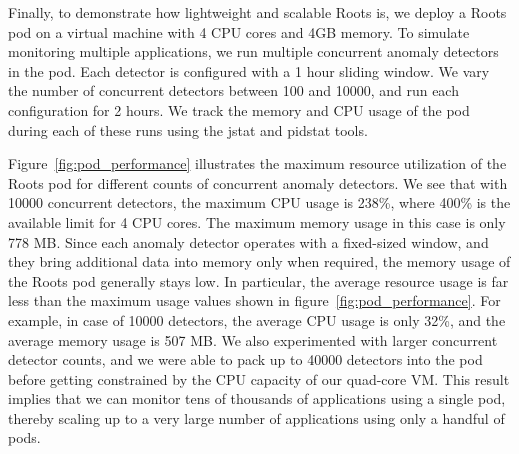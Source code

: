 Finally, to demonstrate how lightweight and scalable Roots is, we deploy
a Roots pod on a virtual machine with 4 CPU cores and 4GB memory.
To simulate monitoring multiple applications, we run multiple concurrent anomaly
detectors in the pod. Each detector is configured with a 1 hour sliding window.
We vary the number of concurrent
detectors between 100 and 10000, and run each configuration for
2 hours. We track the memory and CPU usage of the
pod during each of these runs using the jstat and pidstat tools. 

Figure~\ref{fig:pod_performance}
illustrates the maximum resource utilization of the Roots pod for different counts of
concurrent anomaly detectors. We see that with 10000 concurrent
detectors, the maximum CPU usage is 238\%, where 400\% is the available limit
for 4 CPU cores. The maximum memory usage in this case is only 778 MB. 
Since each anomaly detector operates with a fixed-sized window, and they
bring additional data into memory only when required, the memory
usage of the Roots pod generally stays low. In particular, the average resource usage
is far less than the maximum usage values shown in figure~\ref{fig:pod_performance}. 
For example, in case of 10000 detectors, the average CPU usage is only 32\%, and 
the average memory usage is 507 MB. We also experimented with larger concurrent
detector counts, and we were able to pack up to 40000 detectors into the pod before
getting constrained by the CPU capacity of our quad-core VM.
This result implies that we can monitor tens of thousands 
of applications using a single pod, thereby scaling up to a very large number
of applications using only a handful of pods.
